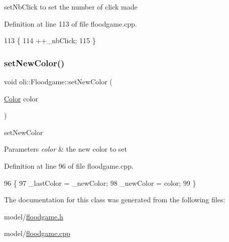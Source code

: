 set\+Nb\+Click to set the number of click made 



Definition at line 113 of file floodgame.\+cpp.


\begin{DoxyCode}
113                           \{
114     ++\_nbClick;
115 \}
\end{DoxyCode}
\hypertarget{classoli_1_1_floodgame_a371ea67d0f296c8cd3ba07e1d31cb7fe}{}\label{classoli_1_1_floodgame_a371ea67d0f296c8cd3ba07e1d31cb7fe} 
\subsubsection{\texorpdfstring{set\+New\+Color()}{setNewColor()}}
{\footnotesize\ttfamily void oli\+::\+Floodgame\+::set\+New\+Color (\begin{DoxyParamCaption}\item[{\hyperlink{namespaceoli_aac44697e43b3ab2ad32fe892ab2276eb}{Color}}]{color }\end{DoxyParamCaption})}



set\+New\+Color 


\begin{DoxyParams}{Parameters}
{\em color} & the new color to set \\
\hline
\end{DoxyParams}


Definition at line 96 of file floodgame.\+cpp.


\begin{DoxyCode}
96                                       \{
97     \_lastColor = \_newColor;
98     \_newColor = color;
99 \}
\end{DoxyCode}


The documentation for this class was generated from the following files\+:\begin{DoxyCompactItemize}
\item 
model/\hyperlink{floodgame_8h}{floodgame.\+h}\item 
model/\hyperlink{floodgame_8cpp}{floodgame.\+cpp}\end{DoxyCompactItemize}
